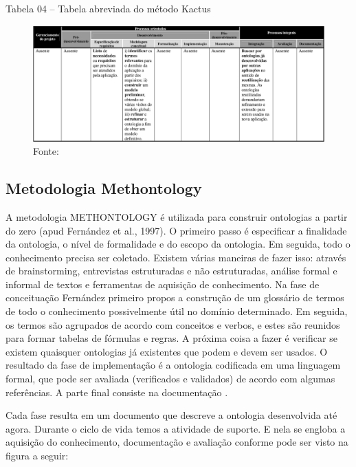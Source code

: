 \documentclass[a4paper]{report}
\begin{document}
\pagebreak

Tabela 04 – Tabela abreviada do método Kactus

\begin{figure}[h] 
\centering %
\includegraphics[scale=0.4]{Figuras/7.png} %
\caption{Fonte: \cite{DanielaLucas2008}}
\end{figure}

\subsection{Metodologia Methontology} 
\qquad A metodologia METHONTOLOGY é utilizada para construir ontologias a partir do zero (apud Fernández et al., 1997). O primeiro passo é especificar a finalidade da ontologia, o nível de formalidade e do escopo da ontologia. Em seguida, todo o conhecimento precisa ser coletado. Existem várias maneiras de fazer isso: através de brainstorming, entrevistas estruturadas e não estruturadas, análise formal e informal de textos e ferramentas de aquisição de conhecimento. Na fase de conceituação Fernández  primeiro propos a construção de um glossário de termos de todo o conhecimento possivelmente útil no domínio determinado. Em seguida, os termos são agrupados de acordo com conceitos e verbos, e estes são reunidos para formar tabelas de fórmulas e regras. A próxima coisa a fazer é verificar se existem quaisquer ontologias já existentes que podem e devem ser usados. O resultado da fase de implementação é a ontologia codificada em uma linguagem formal, que pode ser avaliada (verificados e validados) de acordo com algumas referências. A parte final consiste na documentação \cite{VariosAutores2009}. 
 
Cada fase resulta em um documento que descreve a ontologia desenvolvida até agora. Durante o ciclo de vida temos a atividade de suporte. E nela se engloba a aquisição do conhecimento, documentação e avaliação conforme pode ser visto na figura a seguir:
\end{document}
